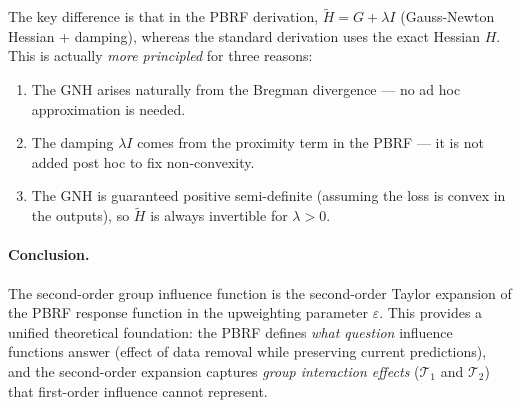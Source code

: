 \documentclass{article}
\theoremstyle{plain}
\theoremstyle{definition}
\theoremstyle{remark}
\begin{document}
The key difference is that in the PBRF derivation, $\tilde{H} = G + \lambda I$
(Gauss-Newton Hessian + damping), whereas the standard derivation uses the exact Hessian $H$.
This is actually \emph{more principled} for three reasons:
\begin{enumerate}
\item The GNH arises naturally from the Bregman divergence --- no ad hoc approximation is needed.
\item The damping $\lambda I$ comes from the proximity term in the PBRF --- it is not added post hoc to fix non-convexity.
\item The GNH is guaranteed positive semi-definite (assuming the loss is convex in the outputs), so $\tilde{H}$ is always invertible for $\lambda > 0$.
\end{enumerate}

\paragraph{Conclusion.}
The second-order group influence function is the second-order Taylor expansion of the
PBRF response function in the upweighting parameter $\varepsilon$.
This provides a unified theoretical foundation: the PBRF defines
\emph{what question} influence functions answer (effect of data removal while preserving current predictions),
and the second-order expansion captures \emph{group interaction effects} ($\mathcal{T}_1$ and $\mathcal{T}_2$)
that first-order influence cannot represent.
\end{document}
